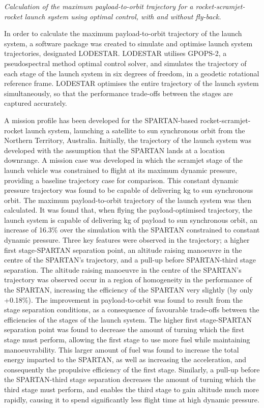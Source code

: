 	\vspace{10pt}
\emph{Calculation of the maximum payload-to-orbit trajectory for a rocket-scramjet-rocket launch system using optimal control, with and without fly-back.}

In order to calculate the maximum payload-to-orbit trajectory of the launch system, a software package was created to simulate and optimise launch system trajectories, designated LODESTAR. LODESTAR utilises GPOPS-2, a pseudospectral method optimal control solver, and simulates the trajectory of each stage of the launch system in six degrees of freedom, in a geodetic rotational reference frame. 
LODESTAR optimises the entire trajectory of the launch system simultaneously, so that the performance trade-offs between the stages are captured accurately.

A mission profile has been developed for the SPARTAN-based rocket-scramjet-rocket launch system, launching a satellite to sun synchronous orbit from the Northern Territory, Australia. 
Initially, the trajectory of the launch system was developed with the assumption that the SPARTAN lands at a location downrange.
A mission case was developed in which the scramjet stage of the launch vehicle was constrained to flight at its maximum dynamic pressure, providing a baseline trajectory case for comparison. This constant dynamic pressure trajectory was found to be capable of delivering \PayloadToOrbitConstqNoReturn kg to sun synchronous orbit. 
The maximum payload-to-orbit trajectory of the launch system was then calculated. It was found that, when flying the payload-optimised trajectory, the launch system is capable of delivering \PayloadToOrbitStandardNoReturn kg of payload to sun synchronous orbit, an increase of 16.3\% over the simulation with the SPARTAN constrained to constant dynamic pressure. 
Three key features were observed in the trajectory; a higher first stage-SPARTAN separation point, an altitude raising manoeuvre in the centre of the SPARTAN's trajectory, and a pull-up before SPARTAN-third stage separation.
The altitude raising manoeuvre in the centre of the SPARTAN's trajectory was observed occur in a region of homogeneity in the performance of the SPARTAN, increasing the efficiency of the SPARTAN very slightly (by only +0.18\%). 
The improvement in payload-to-orbit was found to result from the stage separation conditions, as a consequence of favourable trade-offs between the efficiencies of the stages of the launch system.
The higher first stage-SPARTAN separation point was found to decrease the amount of turning which the first stage must perform, allowing the first stage to use more fuel while maintaining manoeuvrability. This larger amount of fuel was found to increase the total energy imparted to the SPARTAN, as well as increasing the acceleration, and consequently the propulsive efficiency of the first stage. Similarly, a pull-up before the SPARTAN-third stage separation decreases the amount of turning which the third stage must perform, and enables the third stage to gain altitude much more rapidly, causing it to spend significantly less flight time at high dynamic pressure. 
